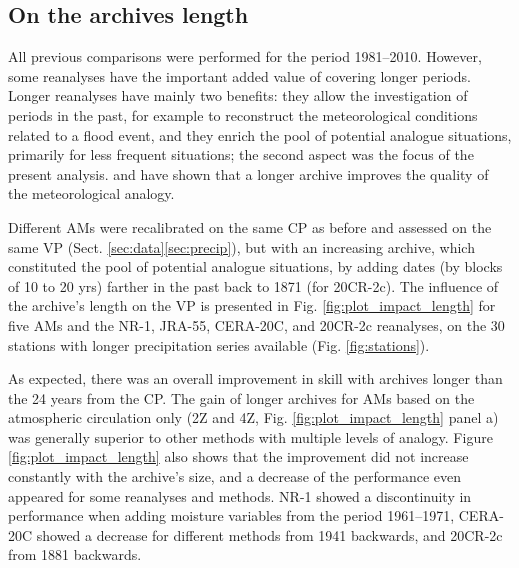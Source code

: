 \documentclass[smallextended]{svjour3}       %
\begin{document}
	
	\subsection{On the archives length}
	\label{sec:length}
	
	All previous comparisons were performed for the period 1981--2010. However, some reanalyses have the important added value of covering longer periods. Longer reanalyses have mainly two benefits: they allow the investigation of periods in the past, for example to reconstruct the meteorological conditions related to a flood event, and they enrich the pool of potential analogue situations, primarily for less frequent situations; the second aspect was the focus of the present analysis. \citet{Ruosteenoja1988} and \citet{Vandendool1994} have shown that a longer archive improves the quality of the meteorological analogy.
	
	Different AMs were recalibrated on the same CP as before and assessed on the same VP (Sect. \ref{sec:data}\ref{sec:precip}), but with an increasing archive, which constituted the pool of potential analogue situations, by adding dates (by blocks of 10 to 20 yrs) farther in the past back to 1871 (for 20CR-2c). The influence of the archive's length on the VP is presented in Fig. \ref{fig:plot_impact_length} for five AMs and the NR-1, JRA-55, CERA-20C, and 20CR-2c reanalyses, on the 30 stations with longer precipitation series available (Fig. \ref{fig:stations}). 
	
	As expected, there was an overall improvement in skill with archives longer than the 24 years from the CP. The gain of longer archives for AMs based on the atmospheric circulation only (2Z and 4Z, Fig. \ref{fig:plot_impact_length} panel a) was generally superior to other methods with multiple levels of analogy. Figure \ref{fig:plot_impact_length} also shows that the improvement did not increase constantly with the archive's size, and a decrease of the performance even appeared for some reanalyses and methods. NR-1 showed a discontinuity in performance when adding moisture variables from the period 1961--1971, CERA-20C showed a decrease for different methods from 1941 backwards, and 20CR-2c from 1881 backwards.
	
\end{document}

